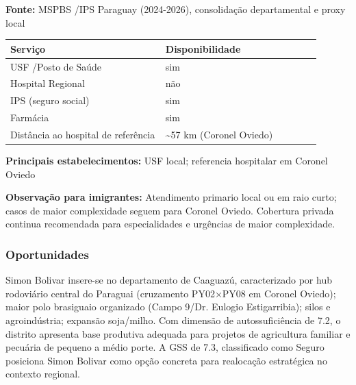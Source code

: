 \textbf{Fonte:} MSPBS /\allowbreak  IPS Paraguay (2024-2026), consolidação
departamental e proxy local

{\def\LTcaptype{none} %
\begin{longtable}{@{}>{\raggedright\arraybackslash}p{0.45\linewidth} >{\raggedright\arraybackslash}p{0.45\linewidth}@{}}
\toprule\noalign{}
Serviço & Disponibilidade \\
\midrule\noalign{}
\endhead
\bottomrule\noalign{}
\endlastfoot
USF /\allowbreak  Posto de Saúde & sim \\
Hospital Regional & não \\
IPS (seguro social) & sim \\
Farmácia & sim \\
Distância ao hospital de referência & \textasciitilde57 km (Coronel
Oviedo) \\
\end{longtable}
}

\textbf{Principais estabelecimentos:} USF local; referencia hospitalar
em Coronel Oviedo

\textbf{Observação para imigrantes:} Atendimento primario local ou em
raio curto; casos de maior complexidade seguem para Coronel Oviedo.
Cobertura privada continua recomendada para especialidades e urgências
de maior complexidade.
\newpage

\subsubsection*{Oportunidades}\label{oport-simon-bolivar-0519}
Simon Bolivar insere-se no departamento de Caaguazú, caracterizado por hub rodoviário central do Paraguai (cruzamento PY02×PY08 em Coronel Oviedo); maior polo brasiguaio organizado (Campo 9/Dr. Eulogio Estigarribia); silos e agroindústria; expansão soja/milho. Com dimensão de autossuficiência de 7.2, o distrito apresenta base produtiva adequada para projetos de agricultura familiar e pecuária de pequeno a médio porte. A GSS de 7.3, classificado como Seguro posiciona Simon Bolivar como opção concreta para realocação estratégica no contexto regional.

